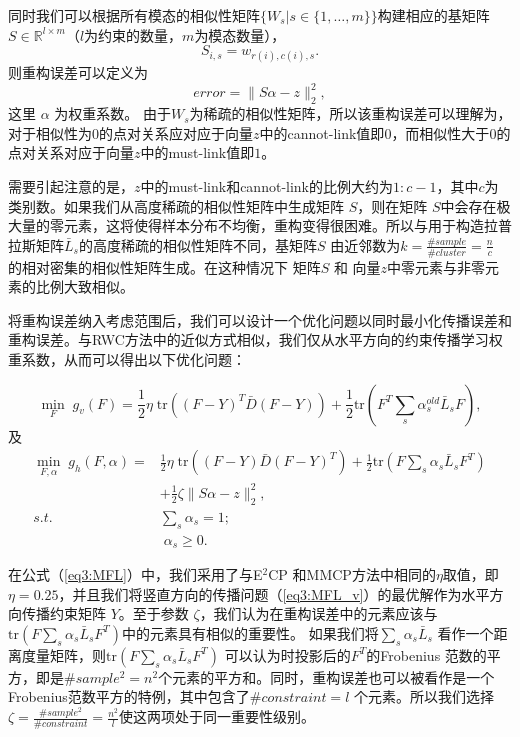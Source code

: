 同时我们可以根据所有模态的相似性矩阵$ \{{W}_s|s\in\{1,\dots,m\}\} $构建相应的基矩阵$ {S} \in \mathbb{R}^{l\times m}$（$l$为约束的数量，$m$为模态数量），
\begin{equation}
 {S}_{i,s} = w_{r(i), c(i), s}.
\end{equation}
则重构误差可以定义为
\begin{equation}
error = \|{S}{\alpha}-{z}\|_2^2,
\end{equation}
这里 $ {\alpha} $ 为权重系数。
由于${W}_s$为稀疏的相似性矩阵，所以该重构误差可以理解为，对于相似性为$0$的点对关系应对应于向量$z$中的cannot-link值即$0$，而相似性大于$0$的点对关系对应于向量$z$中的must-link值即$1$。

需要引起注意的是，$z$中的must-link和cannot-link的比例大约为$1:c-1 $，其中$c$为类别数。如果我们从高度稀疏的相似性矩阵中生成矩阵 $S$，则在矩阵 $S$中会存在极大量的零元素，这将使得样本分布不均衡，重构变得很困难。所以与用于构造拉普拉斯矩阵$ \bar{{L}}_s $的高度稀疏的相似性矩阵不同，基矩阵$S$ 由近邻数为$ k=\frac{\#sample}{\#cluster} = \frac{n}{c}$ 的相对密集的相似性矩阵生成。在这种情况下 矩阵$S$ 和 向量$z$中零元素与非零元素的比例大致相似。

将重构误差纳入考虑范围后，我们可以设计一个优化问题以同时最小化传播误差和重构误差。与RWC方法中的近似方式相似，我们仅从水平方向的约束传播学习权重系数，从而可以得出以下优化问题：

\begin{equation}
\mathop{\mathrm{min}}_{{F}}\;g_v({F})=\frac{1}{2}\eta \;\mathrm{tr}(({F}-{Y})^T\bar{{D}}({F}-{Y}))+\frac{1}{2}\mathrm{tr}({F}^T \sum_s\alpha_s^{old}\bar{{L}}_s{F}),
\label{eq3:MFL_v}
\end{equation}
及
\begin{equation}
\begin{split}
\mathop{\mathrm{min}}_{{F},{\alpha}}\;g_h({F}, {\alpha})=&\frac{1}{2}\eta\;\mathrm{tr}(({F}-{Y})\bar{{D}}({F}-{Y})^T)+\frac{1}{2}\mathrm{tr}({F} \sum_s\alpha_s\bar{{L}}_s{F}^T) \\ &+\frac{1}{2}\zeta\|{S}{\alpha} - {z}\|_2^2,\\
s.t. \quad\;& \sum_s \alpha_s = 1;\\ &\; \alpha_s \ge 0.
\end{split}
\label{eq3:MFL}
\end{equation}

在公式（\ref{eq3:MFL}）中，我们采用了与E$^2$CP\cite{lu2010constrained} 和MMCP\cite{fu2011multi}方法中相同的$ \eta $取值，即$ \eta = 0.25 $，并且我们将竖直方向的传播问题（\ref{eq3:MFL_v}）的最优解作为水平方向传播约束矩阵 $ {Y} $。至于参数 $ \zeta $，我们认为在重构误差中的元素应该与$ \mathrm{tr}({F} \sum_s\alpha_s\bar{{L}}_s{F}^T) $中的元素具有相似的重要性。 如果我们将$ \sum_s\alpha_s\bar{{L}}_s $ 看作一个距离度量矩阵，则$ \mathrm{tr}({F} \sum_s\alpha_s\bar{{L}}_s{F}^T) $ 可以认为时投影后的$ {F}^T $的Frobenius 范数的平方，即是$\#sample^2=n^2$个元素的平方和。同时，重构误差也可以被看作是一个Frobenius范数平方的特例，其中包含了$ \#constraint = l $ 个元素。所以我们选择 $ \zeta = \frac{\#sample^2}{\#constraint}=\frac{n^2}{l} $使这两项处于同一重要性级别。

